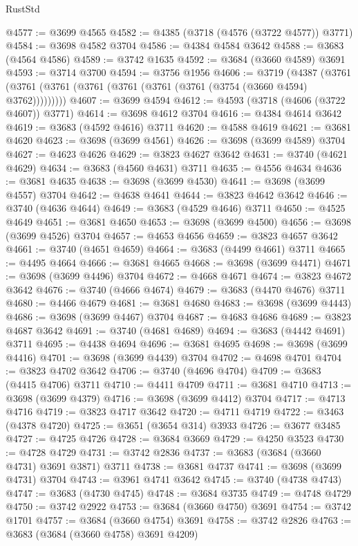 \begin{lexlean}{RustStd}
\begin{coremodule}
{\begin{coremodule}
{{{{{{{{{{{{{{{{{{{{{{{{{{{{{{{{{{{{{{{{{{{{{{{@4577 := @3699 @4565
@4582 := @4385 (@3718 (@4576 (@3722 @4577)) @3771)
@4584 := @3698 @4582 @3704
@4586 := @4384 @4584 @3642
@4588 := @3683 (@4564 @4586)
@4589 := @3742 @1635
@4592 := @3684 (@3660 @4589) @3691
@4593 := @3714 @3700
@4594 := @3756 @1956
@4606 := @3719
    (@4387 (@3761 (@3761 (@3761 (@3761 (@3761 (@3761 (@3761 (@3754 (@3660 @4594) @3762)))))))))
@4607 := @3699 @4594
@4612 := @4593 (@3718 (@4606 (@3722 @4607)) @3771)
@4614 := @3698 @4612 @3704
@4616 := @4384 @4614 @3642
@4619 := @3683 (@4592 @4616) @3711
@4620 := @4588 @4619
@4621 := @3681 @4620
@4623 := @3698 (@3699 @4561)
@4626 := @3698 (@3699 @4589) @3704
@4627 := @4623 @4626
@4629 := @3823 @4627 @3642
@4631 := @3740 (@4621 @4629)
@4634 := @3683 (@4560 @4631) @3711
@4635 := @4556 @4634
@4636 := @3681 @4635
@4638 := @3698 (@3699 @4530)
@4641 := @3698 (@3699 @4557) @3704
@4642 := @4638 @4641
@4644 := @3823 @4642 @3642
@4646 := @3740 (@4636 @4644)
@4649 := @3683 (@4529 @4646) @3711
@4650 := @4525 @4649
@4651 := @3681 @4650
@4653 := @3698 (@3699 @4500)
@4656 := @3698 (@3699 @4526) @3704
@4657 := @4653 @4656
@4659 := @3823 @4657 @3642
@4661 := @3740 (@4651 @4659)
@4664 := @3683 (@4499 @4661) @3711
@4665 := @4495 @4664
@4666 := @3681 @4665
@4668 := @3698 (@3699 @4471)
@4671 := @3698 (@3699 @4496) @3704
@4672 := @4668 @4671
@4674 := @3823 @4672 @3642
@4676 := @3740 (@4666 @4674)
@4679 := @3683 (@4470 @4676) @3711
@4680 := @4466 @4679
@4681 := @3681 @4680
@4683 := @3698 (@3699 @4443)
@4686 := @3698 (@3699 @4467) @3704
@4687 := @4683 @4686
@4689 := @3823 @4687 @3642
@4691 := @3740 (@4681 @4689)
@4694 := @3683 (@4442 @4691) @3711
@4695 := @4438 @4694
@4696 := @3681 @4695
@4698 := @3698 (@3699 @4416)
@4701 := @3698 (@3699 @4439) @3704
@4702 := @4698 @4701
@4704 := @3823 @4702 @3642
@4706 := @3740 (@4696 @4704)
@4709 := @3683 (@4415 @4706) @3711
@4710 := @4411 @4709
@4711 := @3681 @4710
@4713 := @3698 (@3699 @4379)
@4716 := @3698 (@3699 @4412) @3704
@4717 := @4713 @4716
@4719 := @3823 @4717 @3642
@4720 := @4711 @4719
@4722 := @3463 (@4378 @4720)
@4725 := @3651 (@3654 @314) @3933
@4726 := @3677 @3485
@4727 := @4725 @4726
@4728 := @3684 @3669
@4729 := @4250 @3523
@4730 := @4728 @4729
@4731 := @3742 @2836
@4737 := @3683 (@3684 (@3660 @4731) @3691 @3871) @3711
@4738 := @3681 @4737
@4741 := @3698 (@3699 @4731) @3704
@4743 := @3961 @4741 @3642
@4745 := @3740 (@4738 @4743)
@4747 := @3683 (@4730 @4745)
@4748 := @3684 @3735
@4749 := @4748 @4729
@4750 := @3742 @2922
@4753 := @3684 (@3660 @4750) @3691
@4754 := @3742 @1701
@4757 := @3684 (@3660 @4754) @3691
@4758 := @3742 @2826
@4763 := @3683 (@3684 (@3660 @4758) @3691 @4209)
}}}}}}}}}}}}}}}}}}}}}}}}}}}}}}}}}}}}}}}}}}}}}}}
\end{coremodule}}
\end{coremodule}
\end{lexlean}
